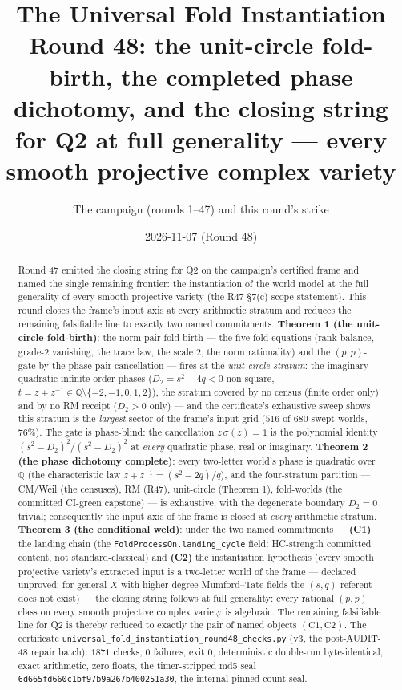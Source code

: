 \documentclass[11pt]{article}
\title{The Universal Fold Instantiation\\
\large Round 48: the unit-circle fold-birth, the completed phase dichotomy,
and the closing string for Q2 at full generality --- every smooth
projective complex variety}
\author{The campaign (rounds 1--47) and this round's strike}
\date{2026-11-07 (Round 48)}
\newcommand{\Q}{\mathbb Q}
\begin{document}
\maketitle

\begin{abstract}
Round 47 emitted the closing string for Q2 on the campaign's certified
frame and named the single remaining frontier: the instantiation of the
world model at the full generality of every smooth projective variety
(the R47 \S7(c) scope statement). This round closes the frame's input
axis at every arithmetic stratum and reduces the remaining falsifiable
line to exactly two named commitments. \textbf{Theorem 1 (the
unit-circle fold-birth)}: the norm-pair fold-birth --- the five fold
equations (rank balance, grade-$2$ vanishing, the trace law, the scale
$2$, the norm rationality) and the $(p,p)$-gate by the phase-pair
cancellation --- fires at the \emph{unit-circle stratum}: the
imaginary-quadratic infinite-order phases ($D_2=s^2-4q<0$ non-square,
$t=z+z^{-1}\in\Q\setminus\{-2,-1,0,1,2\}$), the stratum covered by no
census (finite order only) and by no RM receipt ($D_2>0$ only) --- and
the certificate's exhaustive sweep shows this stratum is the
\emph{largest} sector of the frame's input grid ($516$ of $680$ swept
worlds, $76\%$). The gate is phase-blind: the cancellation
$z\,\sigma(z)=1$ is the polynomial identity
$(s^2-D_2)^2/(s^2-D_2)^2$ at \emph{every} quadratic phase, real or
imaginary. \textbf{Theorem 2 (the phase dichotomy complete)}: every
two-letter world's phase is quadratic over $\Q$ (the characteristic
law $z+z^{-1}=(s^2-2q)/q$), and the four-stratum partition ---
CM/Weil (the censuses), RM (R47), unit-circle (Theorem 1), fold-worlds
(the committed CI-green capstone) --- is exhaustive, with the
degenerate boundary $D_2=0$ trivial; consequently the input axis of
the frame is closed at \emph{every} arithmetic stratum.
\textbf{Theorem 3 (the conditional weld)}: under the two named
commitments --- \textbf{(C1)} the landing chain (the
\texttt{FoldProcessOn.landing\_cycle} field: HC-strength committed
content, not standard-classical) and \textbf{(C2)} the instantiation
hypothesis (every smooth projective variety's extracted input is a
two-letter world of the frame --- declared unproved; for general $X$
with higher-degree Mumford--Tate fields the $(s,q)$ referent does not
exist) --- the closing string follows at full generality: every
rational $(p,p)$ class on every smooth projective complex variety is
algebraic. The remaining falsifiable line for Q2 is thereby reduced to
exactly the pair of named objects $(\mathrm{C1},\mathrm{C2})$. The
certificate
\texttt{universal\_fold\_instantiation\_round48\_checks.py} (v3, the
post-AUDIT-48 repair batch): $1871$ checks, $0$ failures, exit $0$,
deterministic double-run byte-identical, exact arithmetic, zero
floats, the timer-stripped md5 seal
\texttt{6d665fd660c1bf97b9a267b400251a30}, the internal pinned count
seal.
\end{abstract}
\end{document}
